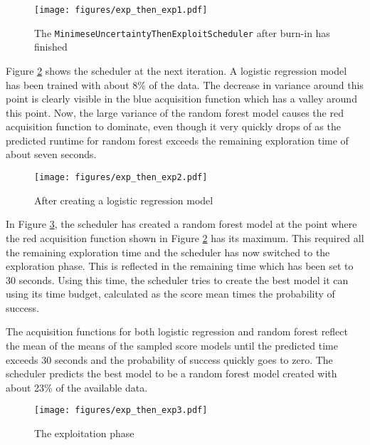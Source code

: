 \documentclass[a4paper,12pt,twoside,openright]{report}
\begin{document}
\begin{figure}
\centering
  \texttt{[image: figures/exp\_then\_exp1.pdf]}
  \caption{The \texttt{MinimeseUncertaintyThenExploitScheduler} after burn-in has finished}
  \label{sched:exp_then_exp1}
\end{figure}

Figure \ref{sched:exp_then_exp2} shows the scheduler at the next iteration. A logistic regression model has been trained with about 8\% of the data. The decrease in variance around this point is clearly visible in the blue acquisition function which has a valley around this point. Now, the large variance of the random forest model causes the red acquisition function to dominate, even though it very quickly drops of as the predicted runtime for random forest exceeds the remaining exploration time of about seven seconds.

\begin{figure}
\centering
  \texttt{[image: figures/exp\_then\_exp2.pdf]}
  \caption{After creating a logistic regression model}
  \label{sched:exp_then_exp2}
\end{figure}

In Figure \ref{sched:exp_then_exp3}, the scheduler has created a random forest model at the point where the red acquisition function shown in Figure \ref{sched:exp_then_exp2} has its maximum. This required all the remaining exploration time and the scheduler has now switched to the exploration phase. This is reflected in the remaining time which has been set to 30 seconds. Using this time, the scheduler tries to create the best model it can using its time budget, calculated as the score mean times the probability of success.

The acquisition functions for both logistic regression and random forest reflect the mean of the means of the sampled score models until the predicted time exceeds 30 seconds and the probability of success quickly goes to zero. The scheduler predicts the best model to be a random forest model created with about 23\% of the available data.

\begin{figure}
\centering
  \texttt{[image: figures/exp\_then\_exp3.pdf]}
  \caption{The exploitation phase}
  \label{sched:exp_then_exp3}
\end{figure}
\end{document}
